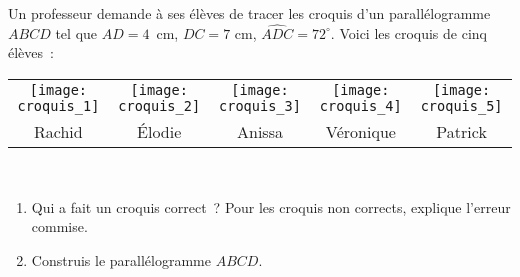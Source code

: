 
\begin{activite}
Un professeur demande à ses élèves de tracer les croquis d'un parallélogramme $ABCD$ tel que $AD = 4$ cm, $DC = 7$ cm, $\widehat{ADC} = 72^\circ$. Voici les croquis de cinq élèves : \\[0.5cm]
\begin{tabularx}{0.8\textwidth}{ccccc}
 \texttt{[image: croquis\_1]} & \texttt{[image: croquis\_2]} & \texttt{[image: croquis\_3]} & \texttt{[image: croquis\_4]} & \texttt{[image: croquis\_5]} \\
 Rachid & Élodie & Anissa & Véronique & Patrick \\
\end{tabularx} \\


\begin{enumerate}

\item Qui a fait un croquis correct ? Pour les croquis non corrects, explique l'erreur commise.

\item Construis le parallélogramme $ABCD$.
\end{enumerate}

\end{activite}


\newpage

